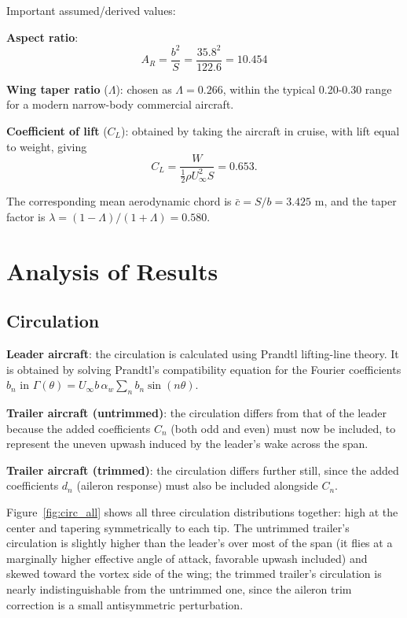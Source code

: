 \documentclass[11pt,a4paper]{article}
\begin{document}
Important assumed/derived values:

\textbf{Aspect ratio}: $$A_R = \frac{b^2}{S} = \frac{35.8^2}{122.6} = \mathbf{10.454}$$

\textbf{Wing taper ratio} ($\Lambda$): chosen as $\Lambda = \mathbf{0.266}$, within the typical 0.20-0.30 range for a modern narrow-body commercial aircraft.

\textbf{Coefficient of lift} ($C_L$): obtained by taking the aircraft in cruise, with lift equal to weight, giving $$C_L = \frac{W}{\tfrac12 \rho U_\infty^2 S} = \mathbf{0.653}.$$

The corresponding mean aerodynamic chord is $\bar c = S/b = 3.425$ m, and the taper factor is $\lambda = (1-\Lambda)/(1+\Lambda) = 0.580$.

\section{Analysis of Results}

\subsection{Circulation}

\textbf{Leader aircraft}: the circulation is calculated using Prandtl lifting-line theory. It is obtained by solving Prandtl's compatibility equation for the Fourier coefficients $b_n$ in $\Gamma(\theta) = U_\infty b\,\alpha_w \sum_n b_n \sin(n\theta)$.

\textbf{Trailer aircraft (untrimmed)}: the circulation differs from that of the leader because the added coefficients $C_n$ (both odd and even) must now be included, to represent the uneven upwash induced by the leader's wake across the span.

\textbf{Trailer aircraft (trimmed)}: the circulation differs further still, since the added coefficients $d_n$ (aileron response) must also be included alongside $C_n$.

Figure~\ref{fig:circ_all} shows all three circulation distributions together: high at the center and tapering symmetrically to each tip. The untrimmed trailer's circulation is slightly higher than the leader's over most of the span (it flies at a marginally higher effective angle of attack, favorable upwash included) and skewed toward the vortex side of the wing; the trimmed trailer's circulation is nearly indistinguishable from the untrimmed one, since the aileron trim correction is a small antisymmetric perturbation.
\end{document}
